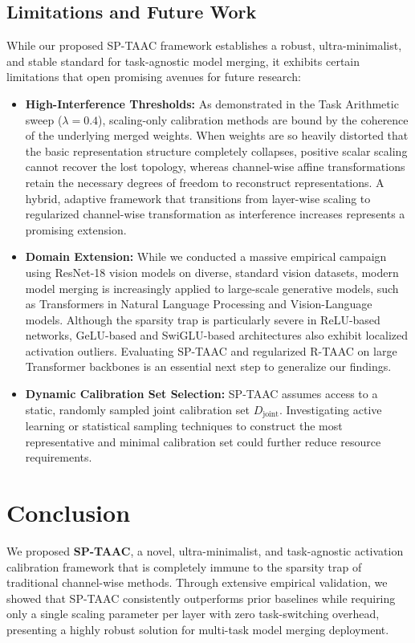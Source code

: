 \documentclass{article}
\theoremstyle{plain}
\theoremstyle{definition}
\theoremstyle{remark}
\begin{document}
\subsection{Limitations and Future Work}
While our proposed SP-TAAC framework establishes a robust, ultra-minimalist, and stable standard for task-agnostic model merging, it exhibits certain limitations that open promising avenues for future research:
\begin{itemize}
    \item \textbf{High-Interference Thresholds:} As demonstrated in the Task Arithmetic sweep ($\lambda = 0.4$), scaling-only calibration methods are bound by the coherence of the underlying merged weights. When weights are so heavily distorted that the basic representation structure completely collapses, positive scalar scaling cannot recover the lost topology, whereas channel-wise affine transformations retain the necessary degrees of freedom to reconstruct representations. A hybrid, adaptive framework that transitions from layer-wise scaling to regularized channel-wise transformation as interference increases represents a promising extension.
    \item \textbf{Domain Extension:} While we conducted a massive empirical campaign using ResNet-18 vision models on diverse, standard vision datasets, modern model merging is increasingly applied to large-scale generative models, such as Transformers in Natural Language Processing and Vision-Language models. Although the sparsity trap is particularly severe in ReLU-based networks, GeLU-based and SwiGLU-based architectures also exhibit localized activation outliers. Evaluating SP-TAAC and regularized R-TAAC on large Transformer backbones is an essential next step to generalize our findings.
    \item \textbf{Dynamic Calibration Set Selection:} SP-TAAC assumes access to a static, randomly sampled joint calibration set $D_{\text{joint}}$. Investigating active learning or statistical sampling techniques to construct the most representative and minimal calibration set could further reduce resource requirements.
\end{itemize}

\section{Conclusion}
\label{sec:conclusion}
We proposed \textbf{SP-TAAC}, a novel, ultra-minimalist, and task-agnostic activation calibration framework that is completely immune to the sparsity trap of traditional channel-wise methods. Through extensive empirical validation, we showed that SP-TAAC consistently outperforms prior baselines while requiring only a single scaling parameter per layer with zero task-switching overhead, presenting a highly robust solution for multi-task model merging deployment.
\end{document}
